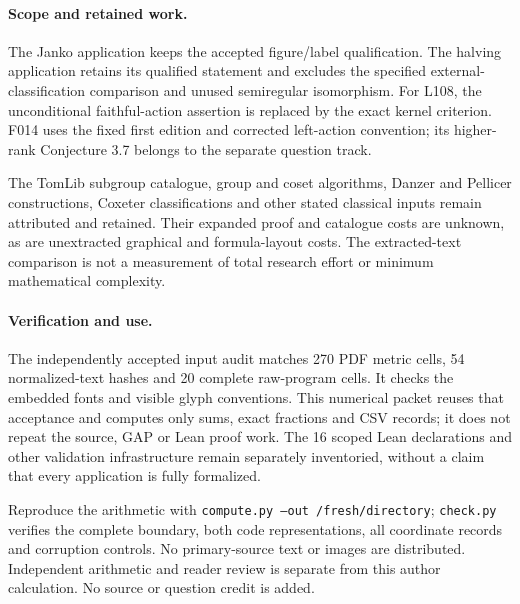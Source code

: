 \documentclass[11pt,a4paper]{article}
\begin{document}
\paragraph{Scope and retained work.}
The Janko application keeps the accepted figure/label qualification. The
halving application retains its qualified statement and excludes the
specified external-classification comparison and unused semiregular
isomorphism. For L108, the unconditional faithful-action assertion is
replaced by the exact kernel criterion. F014 uses the fixed first edition
and corrected left-action convention; its higher-rank Conjecture 3.7 belongs
to the separate question track.

The TomLib subgroup catalogue, group and coset algorithms, Danzer and
Pellicer constructions, Coxeter classifications and other stated classical
inputs remain attributed and retained. Their expanded proof and catalogue
costs are unknown, as are unextracted graphical and formula-layout costs.
The extracted-text comparison is not a measurement of total research effort
or minimum mathematical complexity.

\paragraph{Verification and use.}
The independently accepted input audit matches 270 PDF metric cells,
54 normalized-text hashes and 20 complete raw-program cells. It checks the
embedded fonts and visible glyph conventions. This numerical packet reuses
that acceptance and computes only sums, exact fractions and CSV records;
it does not repeat the source, GAP or Lean proof work. The 16 scoped Lean
declarations and other validation infrastructure remain separately
inventoried, without a claim that every application is fully formalized.

Reproduce the arithmetic with \texttt{compute.py --out /fresh/directory};
\texttt{check.py} verifies the complete boundary, both code representations,
all coordinate records and corruption controls. No primary-source text or
images are distributed. Independent arithmetic and reader review is separate
from this author calculation. No source or question credit is added.
\end{document}
